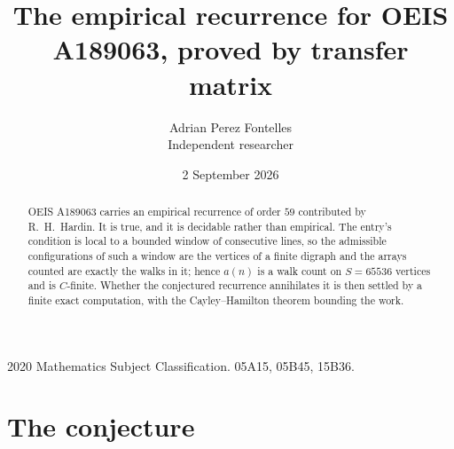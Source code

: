 \documentclass[11pt,a4paper]{article}
\title{The empirical recurrence for OEIS A189063, proved by transfer matrix}
\author{Adrian Perez Fontelles\\ \small Independent researcher}
\date{2 September 2026}
\theoremstyle{plain}
\theoremstyle{definition}
\begin{document}
\maketitle

\begin{abstract}
OEIS A189063 carries an empirical recurrence of order $59$ contributed by R.~H.~Hardin. It is
true, and it is decidable rather than empirical. The entry's condition is local to a bounded window of consecutive lines, so
the admissible configurations of such a window are the vertices of a finite digraph and the
arrays counted are exactly the walks in it; hence $a(n)$ is a walk count on $S=65536$ vertices
and is $C$-finite. Whether the conjectured recurrence annihilates it is then settled by a
finite exact computation, with the Cayley--Hamilton theorem bounding the work.
\end{abstract}

\noindent\small 2020 Mathematics Subject Classification. 05A15, 05B45, 15B36.\normalsize

\section{The conjecture}
\end{document}
